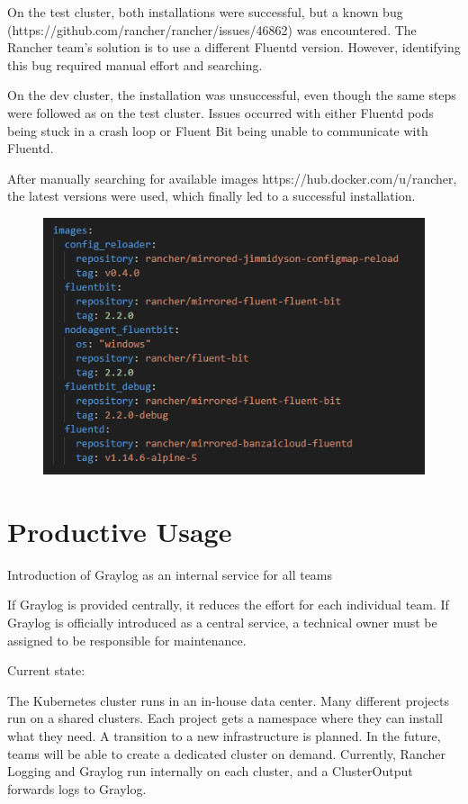 \documentclass[../main.tex]{subfiles}
\begin{document}
On the test cluster, both installations were successful, but a known bug 
(https://github.com/rancher/rancher/issues/46862) was encountered. The Rancher team’s solution is to use a different Fluentd version. However, identifying this bug required manual effort and searching.  

On the dev cluster, the installation was unsuccessful, even though the same steps were followed as on the test cluster. Issues occurred with either Fluentd pods being stuck in a crash loop or Fluent Bit being unable to communicate with Fluentd. 

After manually searching for available images https://hub.docker.com/u/rancher, the latest versions were used, which finally led to a successful installation.

\begin{figure}[H]
        \centering
        \includegraphics[]{img/5-results/values_images.png}
        \caption{ }
        \label{fig:values_images}
\end{figure}

\section{Productive Usage}

Introduction of Graylog as an internal service for all teams

If Graylog is provided centrally, it reduces the effort for each individual team. If Graylog is officially introduced as a central service, a technical owner must be assigned to be responsible for maintenance.

Current state:

The Kubernetes cluster runs in an in-house data center. Many different projects run on a shared clusters. Each project gets a namespace where they can install what they need. A transition to a new infrastructure is planned. In the future, teams will be able to create a dedicated cluster on demand. Currently, Rancher Logging and Graylog run internally on each cluster, and a ClusterOutput forwards logs to Graylog.
\end{document}
